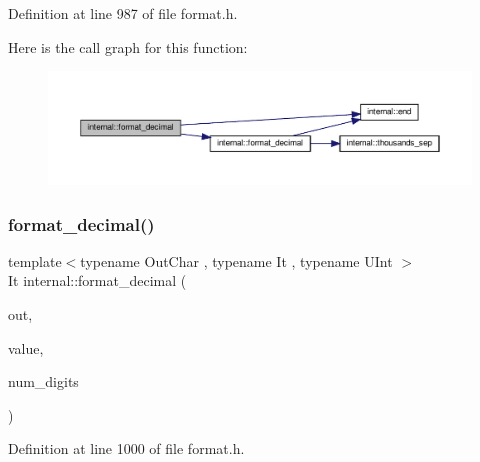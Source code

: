 Definition at line 987 of file format.\+h.

Here is the call graph for this function\+:
\nopagebreak
\begin{figure}[H]
\begin{center}
\leavevmode
\includegraphics[width=350pt]{namespaceinternal_a4a9acc87fcfbaaceb13bd64a92c866ed_cgraph}
\end{center}
\end{figure}
\mbox{\label{namespaceinternal_ab02a01601a4d7fb94f4865485d7b3678}} 
\subsubsection{\texorpdfstring{format\+\_\+decimal()}{format\_decimal()}\hspace{0.1cm}{\footnotesize\ttfamily [3/3]}}
{\footnotesize\ttfamily template$<$typename Out\+Char , typename It , typename U\+Int $>$ \\
It internal\+::format\+\_\+decimal (\begin{DoxyParamCaption}\item[{It}]{out,  }\item[{U\+Int}]{value,  }\item[{int}]{num\+\_\+digits }\end{DoxyParamCaption})\hspace{0.3cm}{\ttfamily [inline]}}



Definition at line 1000 of file format.\+h.

\mbox{\label{namespaceinternal_ae4a81ecefd309d3f64e05535ed306514}} 
